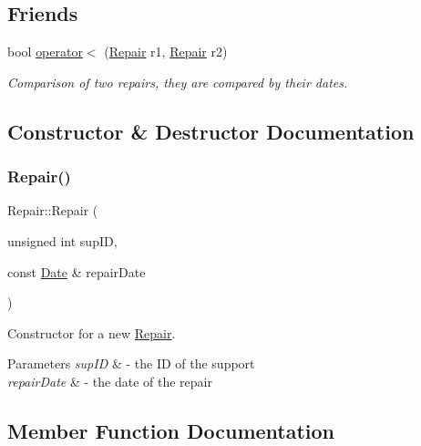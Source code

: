 \subsection*{Friends}
\begin{DoxyCompactItemize}
\item 
bool \mbox{\hyperlink{class_repair_ab74b8c54a490123a54720449488f95e8}{operator$<$}} (\mbox{\hyperlink{class_repair}{Repair}} r1, \mbox{\hyperlink{class_repair}{Repair}} r2)
\begin{DoxyCompactList}\small\item\em Comparison of two repairs, they are compared by their dates. \end{DoxyCompactList}\end{DoxyCompactItemize}


\subsection{Constructor \& Destructor Documentation}
\mbox{\label{class_repair_ac02c65d28404cac9a7d1795bd1196f9e}} 
\subsubsection{\texorpdfstring{Repair()}{Repair()}}
{\footnotesize\ttfamily Repair\+::\+Repair (\begin{DoxyParamCaption}\item[{unsigned int}]{sup\+ID,  }\item[{const \mbox{\hyperlink{class_date}{Date}} \&}]{repair\+Date }\end{DoxyParamCaption})}



Constructor for a new \mbox{\hyperlink{class_repair}{Repair}}. 


\begin{DoxyParams}{Parameters}
{\em sup\+ID} & -\/ the ID of the support \\
\hline
{\em repair\+Date} & -\/ the date of the repair \\
\hline
\end{DoxyParams}


\subsection{Member Function Documentation}
\mbox{\label{class_repair_ab877a9f5af222debc30790047ef3a098}} 
